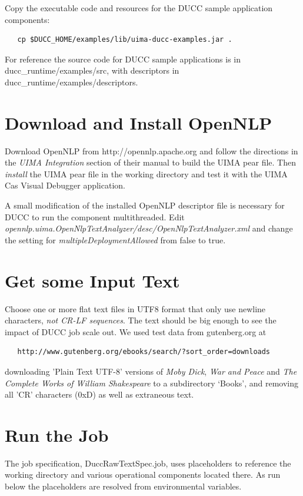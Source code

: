 Copy the executable code and resources for the DUCC sample application components:
\begin{verbatim}
   cp $DUCC_HOME/examples/lib/uima-ducc-examples.jar .
\end{verbatim}

For reference the source code for DUCC sample applications is in ducc\_runtime/examples/src,
with descriptors in ducc\_runtime/examples/descriptors.

\section{Download and Install OpenNLP}
Download OpenNLP from http://opennlp.apache.org and follow the directions in the
{\em UIMA Integration} section of their manual to build the UIMA pear file.
Then {\em install} the UIMA pear file in the working directory and
test it with the UIMA Cas Visual Debugger application.

A small modification of the installed OpenNLP descriptor file
is necessary for DUCC to run the component multithreaded. 
Edit {\em opennlp.uima.OpenNlpTextAnalyzer/desc/OpenNlpTextAnalyzer.xml}
and change the setting for {\em multipleDeploymentAllowed} from false to true.

\section{Get some Input Text}
Choose one or more flat text files in UTF8 format that only use newline characters,
{\em not CR-LF sequences}.
The text should be big enough to see the impact of DUCC job scale out.
We used test data from gutenberg.org at
\begin{verbatim}
   http://www.gutenberg.org/ebooks/search/?sort_order=downloads
\end{verbatim}
downloading 'Plain Text UTF-8' versions of {\em Moby Dick}, {\em War and Peace} and {\em The Complete Works of William Shakespeare} 
to a subdirectory `Books', and removing all 'CR' characters (0xD) as well as extraneous text.

\section{Run the Job}
The job specification, DuccRawTextSpec.job, uses placeholders to reference the working directory
and various operational components located there. As run below the placeholders are resolved
from environmental variables.

